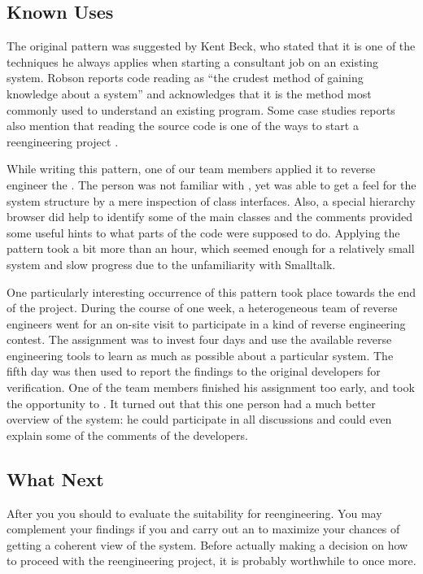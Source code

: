 \documentclass[a4paper,10pt,twoside]{book}
\begin{document}
\subsection*{Known Uses}

The original pattern was suggested by Kent Beck, who stated that it is one of the techniques he always applies when starting a consultant job on an existing system. Robson \cite{Robs91a} reports code reading as ``the crudest method of gaining knowledge about a system'' and acknowledges that it is the method most commonly used to understand an existing program. Some case studies reports also mention that reading the source code is one of the ways to start a reengineering project \cite{Bray95a} \cite{Jack00a}.

While writing this pattern, one of our team members applied it to reverse engineer the  \cite{Robe97a}. The person was not familiar with , yet was able to get a feel for the system structure by a mere inspection of class interfaces. Also, a special hierarchy browser did help to identify some of the main classes and the comments provided some useful hints to what parts of the code were supposed to do. Applying the pattern took a bit more than an hour, which seemed enough for a relatively small system and slow progress due to the unfamiliarity with Smalltalk.

One particularly interesting occurrence of this pattern took place towards the end of the  project. During the course of one week, a heterogeneous team of reverse engineers went for an on-site visit to participate in a kind of reverse engineering contest. The assignment was to invest four days and use the available reverse engineering tools to learn as much as possible about a particular  system. The fifth day was then used to report the findings to the original developers for verification. One of the team members finished his assignment too early, and took the opportunity to . It turned out that this one person had a much better overview of the system: he could participate in all discussions and could even explain some of the comments of the developers.

\subsection*{What Next}

After you  you should  to evaluate the suitability for reengineering. You may complement your findings if you  and carry out an  to maximize your chances of getting a coherent view of the system. Before actually making a decision on how to proceed with the reengineering project, it is probably worthwhile to  once more.
\end{document}
